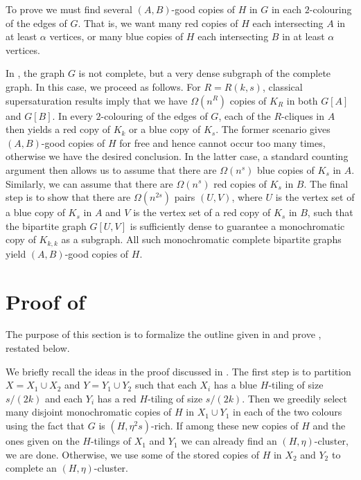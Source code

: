 \documentclass[a4paper,reqno,11pt]{amsart}
\theoremstyle{definition}
\theoremstyle{remark}
\begin{document}
To prove  we must find several $(A,B)$-good copies of $H$ in $G$ in each $2$-colouring of the edges of $G$. That is, we want many red copies of $H$ each intersecting $A$ in at least $\alpha$ vertices, or many blue copies of $H$ each intersecting $B$ in at least $\alpha$ vertices.

In , the graph $G$ is not complete, but a very dense subgraph of the complete graph. In this case, we proceed as follows. For $R = R(k,s)$, classical supersaturation results imply that we have $\Omega(n^R)$ copies of $K_R$ in both $G[A]$ and $G[B]$. In every $2$-colouring of the edges of $G$, each of the $R$-cliques in $A$ then yields a red copy of $K_k$ or a blue copy of $K_s$. The former scenario gives $(A,B)$-good copies of $H$ for free and hence cannot occur too many times, otherwise we have the desired conclusion. In the latter case, a standard counting argument then allows us to assume that there are $\Omega(n^s)$ blue copies of $K_s$ in $A$. Similarly, we can assume that there are $\Omega(n^s)$ red copies of $K_s$ in $B$. The final step is to show that there are $\Omega(n^{2s})$ pairs $(U,V)$, where $U$ is the vertex set of a blue copy of $K_s$ in $A$ and $V$ is the vertex set of a red copy of $K_s$ in $B$, such that the bipartite graph $G[U,V]$ is sufficiently dense to guarantee a monochromatic copy of $K_{k,k}$ as a subgraph. All such monochromatic complete bipartite graphs yield $(A,B)$-good copies of $H$.

\section{Proof of }\label{sec:3} 

The purpose of this section is to formalize the outline given in  and prove , restated below.

\generalHtie*

We briefly recall the ideas in the proof discussed in . The first step is to partition $X=X_1 \cup X_2$ and $Y=Y_1 \cup Y_2$ such that each $X_i$ has a blue $H$-tiling of size $s/(2k)$ and each $Y_i$ has a red $H$-tiling of size $s/(2k)$. Then we greedily select many disjoint monochromatic copies of $H$ in $X_1 \cup Y_1$ in each of the two colours using the fact that $G$ is $(H,\eta^2s)$-rich. If among these new copies of $H$ and the ones given on the $H$-tilings of $X_1$ and $Y_1$ we can already find an $(H,\eta)$-cluster, we are done. Otherwise, we use some of the stored copies of $H$ in $X_2$ and $Y_2$ to complete an $(H,\eta)$-cluster.
\end{document}

